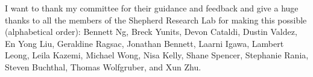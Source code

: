 
\begin{acknowledgments}
I want to thank my committee for their guidance and feedback and give a huge thanks to all the members of the Shepherd Research Lab for making this possible (alphabetical order): Bennett Ng, Breck Yunits, Devon Cataldi, Dustin Valdez, En Yong Liu, Geraldine Ragsac, Jonathan Bennett, Laarni Igawa, Lambert Leong, Leila Kazemi, Michael Wong, Nisa Kelly, Shane Spencer, Stephanie Rania, Steven Buchthal, Thomas Wolfgruber, and Xun Zhu.
\end{acknowledgments}
